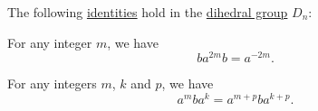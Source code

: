 \begin{proposition}\label{thm:dihedral_group_identities}
  The following \hyperref[prob:equation_solution]{identities} hold in the \hyperref[def:dihedral_group]{dihedral group} \( D_n \):
  \begin{thmenum}
     For any integer \( m \), we have
    \begin{equation}\label{eq:thm:dihedral_group_identities/ba2nb}
      b a^{2m} b = a^{-2m}.
    \end{equation}

     For any integers \( m \), \( k \) and \( p \), we have
    \begin{equation}\label{eq:thm:dihedral_group_identities/anbam}
      a^m b a^k = a^{m+p} b a^{k+p}.
    \end{equation}
  \end{thmenum}
\end{proposition}
